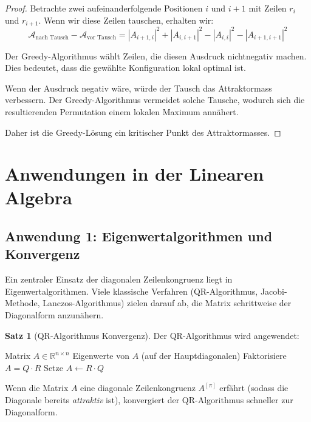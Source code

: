 \documentclass[a4paper,12pt]{article}
\theoremstyle{definition}
\newtheorem{satz}{Satz}
\begin{document}
\begin{proof}
	Betrachte zwei aufeinanderfolgende Positionen $i$ und $i+1$ mit Zeilen $r_i$ und $r_{i+1}$. Wenn wir diese Zeilen tauschen, erhalten wir:
	\[
	\mathcal{A}_{\text{nach Tausch}} - \mathcal{A}_{\text{vor Tausch}} = |A_{i+1,i}|^2 + |A_{i,i+1}|^2 - |A_{i,i}|^2 - |A_{i+1,i+1}|^2
	\]
	
	Der Greedy-Algorithmus wählt Zeilen, die diesen Ausdruck nichtnegativ machen. Dies bedeutet, dass die gewählte Konfiguration lokal optimal ist.
	
	Wenn der Ausdruck negativ wäre, würde der Tausch das Attraktormass verbessern. Der Greedy-Algorithmus vermeidet solche Tausche, wodurch sich die resultierenden Permutation einem lokalen Maximum annähert.
	
	Daher ist die Greedy-Lösung ein kritischer Punkt des Attraktormasses.
\end{proof}

\section{Anwendungen in der Linearen Algebra}

\subsection{Anwendung 1: Eigenwertalgorithmen und Konvergenz}

Ein zentraler Einsatz der diagonalen Zeilenkongruenz liegt in Eigenwertalgorithmen. Viele klassische Verfahren (QR-Algorithmus, Jacobi-Methode, Lanczos-Algorithmus) zielen darauf ab, die Matrix schrittweise der Diagonalform anzunähern.

\begin{satz}[QR-Algorithmus Konvergenz]
	\label{satz:qr-konvergenz}
	Der QR-Algorithmus wird angewendet:
	\begin{algorithm}[H]
	\caption{QR-Algorithmus zur Eigenwertberechnung}
	\label{alg:qr}
	\begin{algorithmic}[1]
	\Require Matrix $A \in \mathbb{R}^{n \times n}$
	\Ensure Eigenwerte von $A$ (auf der Hauptdiagonalen)
	\Repeat
		\State Faktorisiere $A = Q \cdot R$ 
		\State Setze $A \leftarrow R \cdot Q$
	\end{algorithmic}
	\end{algorithm}
	
	Wenn die Matrix $A$ eine diagonale Zeilenkongruenz $A^{[\pi]}$ erfährt (sodass die Diagonale bereits \emph{attraktiv} ist), konvergiert der QR-Algorithmus schneller zur Diagonalform.
\end{satz}
\end{document}
